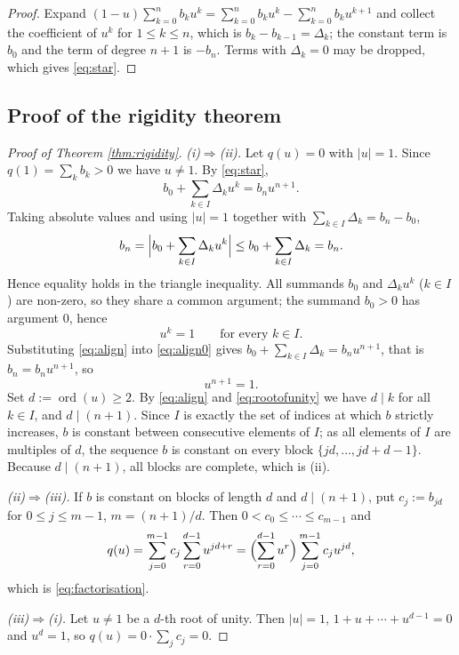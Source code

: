 \documentclass[11pt]{amsart}
\theoremstyle{plain}
\theoremstyle{definition}
\theoremstyle{remark}
\newcommand{\abs}[1]{\lvert #1\rvert}
\newcommand{\set}[1]{\{#1\}}
\DeclareMathOperator{\ord}{ord}
\begin{document}
\begin{proof}
Expand $(1-u)\sum_{k=0}^{n}b_ku^{k}=\sum_{k=0}^{n}b_ku^{k}-\sum_{k=0}^{n}b_ku^{k+1}$ and
collect the coefficient of $u^{k}$ for $1\le k\le n$, which is $b_k-b_{k-1}=\Delta_k$; the
constant term is $b_0$ and the term of degree $n+1$ is $-b_n$. Terms with $\Delta_k=0$ may
be dropped, which gives \eqref{eq:star}.
\end{proof}

\subsection{Proof of the rigidity theorem}

\begin{proof}[Proof of Theorem \ref{thm:rigidity}]
\emph{(i)$\Rightarrow$(ii).} Let $q(u)=0$ with $\abs{u}=1$. Since $q(1)=\sum_kb_k>0$ we
have $u\ne1$. By \eqref{eq:star},
\begin{equation}\label{eq:align0}
b_0+\sum_{k\in I}\Delta_ku^{k}=b_nu^{n+1}.
\end{equation}
Taking absolute values and using $\abs{u}=1$ together with $\sum_{k\in I}\Delta_k=b_n-b_0$,
\[
b_n=\Bigl|b_0+\sum_{k\in I}\Delta_ku^{k}\Bigr|
\le b_0+\sum_{k\in I}\Delta_k=b_n .
\]
Hence equality holds in the triangle inequality. All summands $b_0$ and $\Delta_ku^{k}$
($k\in I$) are non-zero, so they share a common argument; the summand $b_0>0$ has argument
$0$, hence
\begin{equation}\label{eq:align}
u^{k}=1\qquad\text{for every }k\in I .
\end{equation}
Substituting \eqref{eq:align} into \eqref{eq:align0} gives
$b_0+\sum_{k\in I}\Delta_k=b_nu^{n+1}$, that is $b_n=b_nu^{n+1}$, so
\begin{equation}\label{eq:rootofunity}
u^{n+1}=1 .
\end{equation}
Set $d:=\ord(u)\ge2$. By \eqref{eq:align} and \eqref{eq:rootofunity} we have $d\mid k$ for
all $k\in I$, and $d\mid(n+1)$. Since $I$ is exactly the set of indices at which $b$
strictly increases, $b$ is constant between consecutive elements of $I$; as all elements of
$I$ are multiples of $d$, the sequence $b$ is constant on every block
$\set{jd,\dots,jd+d-1}$. Because $d\mid(n+1)$, all blocks are complete, which is (ii).

\emph{(ii)$\Rightarrow$(iii).} If $b$ is constant on blocks of length $d$ and
$d\mid(n+1)$, put $c_j:=b_{jd}$ for $0\le j\le m-1$, $m=(n+1)/d$. Then
$0<c_0\le\cdots\le c_{m-1}$ and
\[
q(u)=\sum_{j=0}^{m-1}c_j\sum_{r=0}^{d-1}u^{jd+r}
=\Bigl(\sum_{r=0}^{d-1}u^{r}\Bigr)\sum_{j=0}^{m-1}c_ju^{jd},
\]
which is \eqref{eq:factorisation}.

\emph{(iii)$\Rightarrow$(i).} Let $u\ne1$ be a $d$-th root of unity. Then $\abs{u}=1$,
$1+u+\cdots+u^{d-1}=0$ and $u^{d}=1$, so $q(u)=0\cdot\sum_jc_j=0$.
\end{proof}
\end{document}
